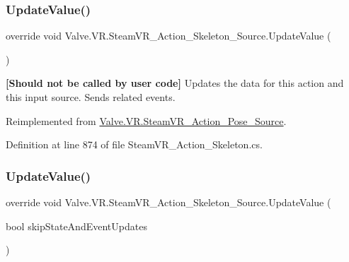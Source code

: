 \subsubsection{\texorpdfstring{UpdateValue()}{UpdateValue()}\hspace{0.1cm}{\footnotesize\ttfamily [1/2]}}
{\footnotesize\ttfamily override void Valve.\+V\+R.\+Steam\+V\+R\+\_\+\+Action\+\_\+\+Skeleton\+\_\+\+Source.\+Update\+Value (\begin{DoxyParamCaption}{ }\end{DoxyParamCaption})\hspace{0.3cm}{\ttfamily [virtual]}}



{\bfseries{\mbox{[}Should not be called by user code\mbox{]}}} Updates the data for this action and this input source. Sends related events. 



Reimplemented from \mbox{\hyperlink{class_valve_1_1_v_r_1_1_steam_v_r___action___pose___source_a2b299c57d8709519f9dfb91da28bde4e}{Valve.\+V\+R.\+Steam\+V\+R\+\_\+\+Action\+\_\+\+Pose\+\_\+\+Source}}.



Definition at line 874 of file Steam\+V\+R\+\_\+\+Action\+\_\+\+Skeleton.\+cs.

\mbox{\label{class_valve_1_1_v_r_1_1_steam_v_r___action___skeleton___source_a1b70de6042eb094c05dcd7f905ff3abd}} 
\subsubsection{\texorpdfstring{UpdateValue()}{UpdateValue()}\hspace{0.1cm}{\footnotesize\ttfamily [2/2]}}
{\footnotesize\ttfamily override void Valve.\+V\+R.\+Steam\+V\+R\+\_\+\+Action\+\_\+\+Skeleton\+\_\+\+Source.\+Update\+Value (\begin{DoxyParamCaption}\item[{bool}]{skip\+State\+And\+Event\+Updates }\end{DoxyParamCaption})\hspace{0.3cm}{\ttfamily [virtual]}}



